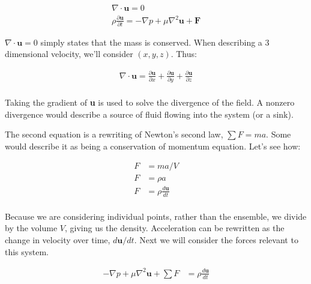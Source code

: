 \begin{equation} \label{NS1}
\begin{split}
\nabla \cdot \mathbf{u} = 0 \\
\rho \frac{\partial \mathbf{u}}{\partial t}= -\nabla p + \mu \nabla{}^2\mathbf{u} + \mathbf{F} 
\end{split}
\end{equation}

$\nabla \cdot \mathbf{u} = 0$ simply states that the mass is conserved. When describing a 3 dimensional velocity, we'll consider $(x,y,z)$. Thus:

\begin{equation} \label{NS2}
\begin{split}
\nabla \cdot \mathbf{u} =  \frac{\partial \textbf{u}}{\partial x} + \frac{\partial \textbf{u}}{\partial y} + \frac{\partial \textbf{u}}{\partial z}\\
\end{split}
\end{equation}

Taking the gradient of \textbf{u} is used to solve the divergence of the field. A nonzero divergence would describe a source of fluid flowing into the system (or a sink).\newline

The second equation is a rewriting of Newton's second law, $\sum F = ma$. Some would describe it as being a conservation of momentum equation. Let's see how: 

\begin{equation} \label{NSderive1}
\begin{split}
F & = ma / V \\
F & = \rho a \\
F & = \rho \frac{d\mathbf{u}}{dt} \\
\end{split}
\end{equation}

Because we are considering individual points, rather than the ensemble, we divide by the volume $V$, giving us the density. Acceleration can be rewritten as the change in velocity over time, $d\mathbf{u} / dt$. Next we will consider the forces relevant to this system. 

\begin{equation} \label{NSderive2}
\begin{split}
-\nabla p + \mu \nabla^2\mathbf{u} + \sum F & = \rho \frac{d\mathbf{u}}{dt} \\
\end{split}
\end{equation}

